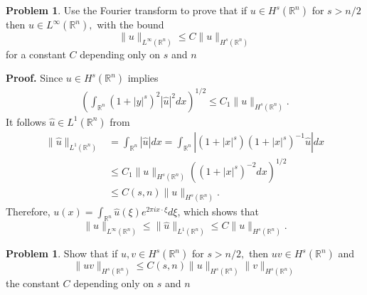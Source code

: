 \documentclass[a4paper]{book}
\newenvironment{eproof}
{\noindent\textbf{Proof.}}
{\qedhere}
\numberwithin{equation}{chapter}
\theoremstyle{definition}
\newtheorem{problem}[exm]{Problem}
\begin{document}
\begin{problem}
  Use the Fourier transform to prove that if $u \in H^{s}\left(\mathbb{R}^{n}\right)$ for $s>n / 2$ then $u \in L^{\infty}\left(\mathbb{R}^{n}\right),$ with the bound
  \[
    \|u\|_{L^{\infty}\left(\mathbb{R}^{n}\right)} \leq C\|u\|_{H^{s}\left(\mathbb{R}^{n}\right)}
  \]
  for a constant $C$ depending only on $s$ and $n$
\end{problem}

\begin{eproof}
  Since $u \in H^s(\mathbb{R}^n)$ implies
  \begin{align*}
    \left( \int_{\mathbb{R}^n} (1 + \left| y \right|^s)^2 \left| \hat{u} \right|^2 dx \right)^{1/2} \leq C_1 \| u \|_{H^s(\mathbb{R}^n)}.
  \end{align*}
  It follows $\hat{u} \in L^1(\mathbb{R}^n)$ from
  \begin{align*}
    \| \hat{u} \|_{L^1(\mathbb{R}^n)} &= \int_{\mathbb{R}^n} \left| \hat{u} \right| dx = \int_{\mathbb{R}^n} \left| (1 + \left| x \right|^s) (1 + \left| x \right|^s)^{-1} \hat{u} \right| dx \\
                                      &\leq C_1 \| u \|_{H^s(\mathbb{R}^n)} \left( (1 + \left| x \right|^s)^{-2} dx \right)^{1/2} \\
                                      &\leq C(s,n)  \| u \|_{H^s(\mathbb{R}^n)} .
  \end{align*}
  Therefore, $u(x) = \int_{\mathbb{R}^n} \hat{u}(\xi) e^{2\pi i x \cdot \xi } d\xi$, which shows that
  \[ \| u \|_{L^\infty(\mathbb{R}^n)} \leq  \| \hat{u} \|_{L^1 (\mathbb{R}^n)} \leq C  \| u \|_{H^s(\mathbb{R}^n)} .  \]
\end{eproof}

\begin{problem}
  Show that if $u, v \in H^{s}\left(\mathbb{R}^{n}\right)$ for $s>n / 2,$ then $u v \in H^{s}\left(\mathbb{R}^{n}\right)$ and
  \[
    \|u v\|_{H^{s}\left(\mathbb{R}^{n}\right)} \leq C(s,n)\|u\|_{H^{s}\left(\mathbb{R}^{n}\right)}\|v\|_{H^{s}\left(\mathbb{R}^{n}\right)}
  \]
  the constant $C$ depending only on $s$ and $n$
\end{problem}
\end{document}

